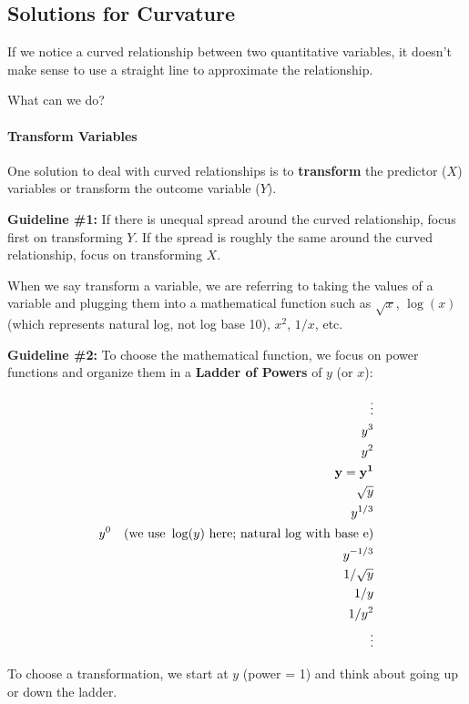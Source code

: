 \documentclass[
]{book}
\begin{document}
\subsection{Solutions for Curvature}\label{solutions-for-curvature}

If we notice a curved relationship between two quantitative variables, it doesn't make sense to use a straight line to approximate the relationship.

What can we do?

\paragraph{Transform Variables}\label{transform-variables}

One solution to deal with curved relationships is to \textbf{transform} the predictor (\(X\)) variables or transform the outcome variable (\(Y\)).

\textbf{Guideline \#1:} If there is unequal spread around the curved relationship, focus first on transforming \(Y\). If the spread is roughly the same around the curved relationship, focus on transforming \(X\).

When we say transform a variable, we are referring to taking the values of a variable and plugging them into a mathematical function such as \(\sqrt{x}\), \(\log(x)\) (which represents natural log, not log base 10), \(x^2\), \(1/x\), etc.

\textbf{Guideline \#2:} To choose the mathematical function, we focus on power functions and organize them in a \textbf{Ladder of Powers} of \(y\) (or \(x\)):

\begin{align}
\vdots\\
y^3\\
y^2\\
\mathbf{y = y^1}\\
\sqrt{y}\\
y^{1/3}\\
y^{0} ~~~  (\hbox{we~use}~\log(y)~\hbox{here; natural log with base e)}\\
y^{-1/3}\\
1/\sqrt{y}\\
1/y\\
1/y^2\\
\vdots
\end{align}

To choose a transformation, we start at \(y\) (power = 1) and think about going up or down the ladder.
\end{document}
